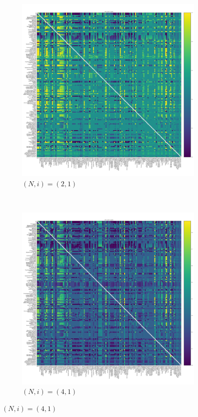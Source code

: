 \documentclass{article}
\begin{document}
\begin{figure}[!hbtp]
    \centering
    \begin{subfigure}[t]{.3\textwidth}
        \centering
        \includegraphics[width=.8\textwidth]{../img/fixation_heatmap_2_1_std.pdf}
        \caption{\((N,i)=(2, 1)\)}
    \end{subfigure}%
    ~
    \begin{subfigure}[t]{.3\textwidth}
        \centering
        \includegraphics[width=.8\textwidth]{../img/fixation_heatmap_4_1_std.pdf}
        \caption{\((N,i)=(4, 1)\)}
    \end{subfigure}%

\end{figure}
\end{document}
